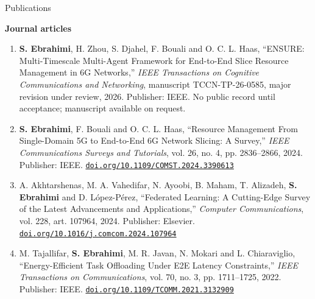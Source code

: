 \documentclass{resume}
\newcommand{\weblink}[2]{\href{#1}{\nolinkurl{#2}}}
\begin{document}
\begin{rSection}{Publications}

\textbf{Journal articles}
\begin{enumerate}[leftmargin=1.3em, topsep=2pt, itemsep=2pt, parsep=0pt]
  \item \textbf{S. Ebrahimi}, H. Zhou, S. Djahel, F. Bouali and O. C. L. Haas, ``ENSURE: Multi-Timescale Multi-Agent Framework for End-to-End Slice Resource Management in 6G Networks,'' \textit{IEEE Transactions on Cognitive Communications and Networking}, manuscript TCCN-TP-26-0585, major revision under review, 2026. Publisher: IEEE. No public record until acceptance; manuscript available on request.
  \item \textbf{S. Ebrahimi}, F. Bouali and O. C. L. Haas, ``Resource Management From Single-Domain 5G to End-to-End 6G Network Slicing: A Survey,'' \textit{IEEE Communications Surveys and Tutorials}, vol. 26, no. 4, pp. 2836--2866, 2024. Publisher: IEEE. \weblink{https://doi.org/10.1109/COMST.2024.3390613}{doi.org/10.1109/COMST.2024.3390613}
  \item A. Akhtarshenas, M. A. Vahedifar, N. Ayoobi, B. Maham, T. Alizadeh, \textbf{S. Ebrahimi} and D. L\'{o}pez-P\'{e}rez, ``Federated Learning: A Cutting-Edge Survey of the Latest Advancements and Applications,'' \textit{Computer Communications}, vol. 228, art. 107964, 2024. Publisher: Elsevier. \weblink{https://doi.org/10.1016/j.comcom.2024.107964}{doi.org/10.1016/j.comcom.2024.107964}
  \item M. Tajallifar, \textbf{S. Ebrahimi}, M. R. Javan, N. Mokari and L. Chiaraviglio, ``Energy-Efficient Task Offloading Under E2E Latency Constraints,'' \textit{IEEE Transactions on Communications}, vol. 70, no. 3, pp. 1711--1725, 2022. Publisher: IEEE. \weblink{https://doi.org/10.1109/TCOMM.2021.3132909}{doi.org/10.1109/TCOMM.2021.3132909}
\end{enumerate}


\end{rSection}
\end{document}
